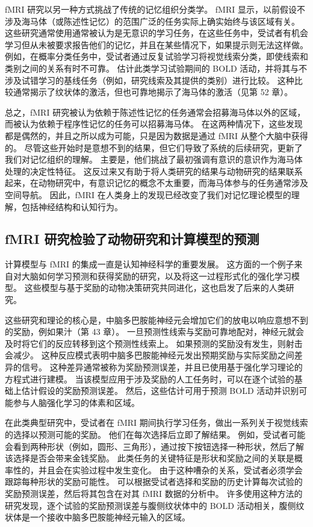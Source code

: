 fMRI 研究以另一种方式挑战了传统的记忆组织分类学。 fMRI 显示，以前假设不涉及海马体（或陈述性记忆）的范围广泛的任务实际上确实始终与该区域有关。 这些研究通常使用通常被认为是无意识的学习任务，在这些任务中，受试者有机会学习但从未被要求报告他们的记忆，并且在某些情况下，如果提示则无法这样做。 例如，在概率分类任务中，受试者通过反复试验学习将视觉线索分类，即使线索和类别之间的关系有时不可靠。 估计此类学习试验期间的 BOLD 活动，并将其与不涉及试错学习的基线任务（例如，研究线索及其提供的类别）进行比较。 这种比较通常揭示了纹状体的激活，但也可靠地揭示了海马体的激活（见第 52 章）。

总之，fMRI 研究被认为依赖于陈述性记忆的任务通常会招募海马体以外的区域，而被认为依赖于程序性记忆的任务可以招募海马体。 在这两种情况下，这些发现都是偶然的，并且之所以成为可能，只是因为数据是通过 fMRI 从整个大脑中获得的。 尽管这些开始时是意想不到的结果，但它们导致了系统的后续研究，更新了我们对记忆组织的理解。 主要是，他们挑战了最初强调有意识的意识作为海马体处理的决定性特征。 这反过来又有助于将人类研究的结果与动物研究的结果联系起来，在动物研究中，有意识记忆的概念不太重要，而海马体参与的任务通常涉及空间导航。 因此，fMRI 在人类身上的发现已经改变了我们对记忆理论模型的理解，包括神经结构和认知行为。

\subsection{fMRI 研究检验了动物研究和计算模型的预测}
计算模型与 fMRI 的集成一直是认知神经科学的重要发展。 这方面的一个例子来自对大脑如何学习预测和获得奖励的研究，以及将这一过程形式化的强化学习模型。 这些模型与基于奖励的动物决策研究共同进化，这也启发了后来的人类研究。

这些研究和理论的核心是，中脑多巴胺能神经元会增加它们的放电以响应意想不到的奖励，例如果汁（第 43 章）。 一旦预测性线索与奖励可靠地配对，神经元就会及时将它们的反应转移到这个预测性线索上。 如果预测的奖励没有发生，则射击会减少。 这种反应模式表明中脑多巴胺能神经元发出预期奖励与实际奖励之间差异的信号。 这种差异通常被称为奖励预测误差，并且已使用基于强化学习理论的方程式进行建模。 当该模型应用于涉及奖励的人工任务时，可以在逐个试验的基础上估计假设的奖励预测误差。 然后，这些估计可用于预测 BOLD 活动并识别可能参与人脑强化学习的体素和区域。

在此类典型研究中，受试者在 fMRI 期间执行学习任务，做出一系列关于视觉线索的选择以预测可能的奖励。 他们在每次选择后立即了解结果。 例如，受试者可能会看到两种形状（例如，圆形、三角形），通过按下按钮选择一种形状，然后了解该选择是否会带来金钱奖励。 此类任务的关键特征是形状和奖励之间的关联是概率性的，并且会在实验过程中发生变化。 由于这种嘈杂的关系，受试者必须学会跟踪每种形状的奖励可能性。 可以根据受试者选择和奖励的历史计算每次试验的奖励预测误差，然后将其包含在对其 fMRI 数据的分析中。 许多使用这种方法的研究发现，逐个试验的奖励预测误差与腹侧纹状体中的 BOLD 活动相关，腹侧纹状体是一个接收中脑多巴胺能神经元输入的区域。

